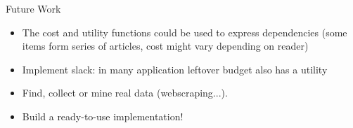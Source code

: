 \documentclass{beamer}
\begin{document}
\begin{frame}{Future Work}

\begin{itemize}
	\item The cost and utility functions could be used to express dependencies (some items form series of articles, cost might vary depending on reader)
	\item Implement slack: in many application leftover budget also has a utility
	\item Find, collect or mine real data (webscraping...).
	\item Build a ready-to-use implementation!
	
\end{itemize}
	
\end{frame}






%
%
\end{document}
